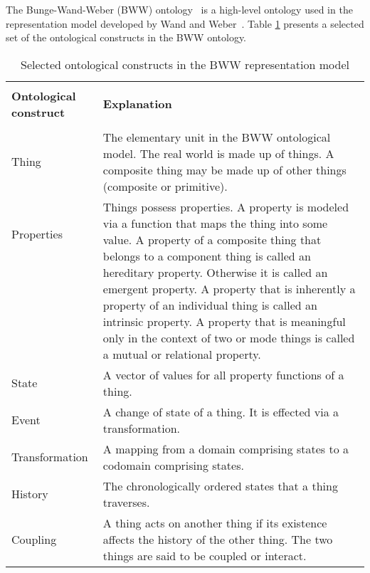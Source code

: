 \documentclass[parskip=full]{uvamscse}
\begin{document}
The Bunge-Wand-Weber (BWW) ontology~\cite{wand1990ontological} is a high-level ontology used in the
representation model developed by Wand and Weber~\cite{wand1995deep}. Table \ref{tab:bwwmodel}
presents a selected set of the ontological constructs in the BWW ontology.

\begin{center}
\begin{longtable}{ | p{11em} | p{30em} | } 
\caption{Selected ontological constructs in the BWW representation model}
\label{tab:bwwmodel}\\
\hline
 &  \\
\textbf{Ontological construct} & \textbf{Explanation} \\
 &  \\
\hline
Thing & The elementary unit in the BWW ontological model. The real world is made up of things. A composite thing may be made up of other things (composite or primitive).~\cite{wand1995deep} \\ 
\hline
Properties & \multirow{7}{30em}{Things possess properties. A property is modeled via a function that maps the thing into some value. A property of a composite thing that belongs to a component thing is called an hereditary property. Otherwise it is called an emergent property. A property that is inherently a property of an individual thing is called an intrinsic property. A property that is meaningful only in the context of two or mode things is called a mutual or relational property.~\cite{wand1995deep}} \\ 
 &  \\ 
 &  \\
 &  \\
 &  \\
 &  \\
 &  \\
 \hline
 State & A vector of values for all property functions of a thing.~\cite{wand1995deep} \\
 \hline
 Event & A change of state of a thing. It is effected via a transformation.~\cite{wand1995deep} \\
 \hline
 Transformation & A mapping from a domain comprising states to a codomain comprising states.~\cite{wand1995deep} \\
 \hline
 History & The chronologically ordered states that a thing traverses.~\cite{weber1996analytical} \\
 \hline
 Coupling & A thing acts on another thing if its existence affects the history of the other thing. The two things are said to be coupled or interact.~\cite{wand1995deep} \\

\end{longtable}
\end{center}
\end{document}
